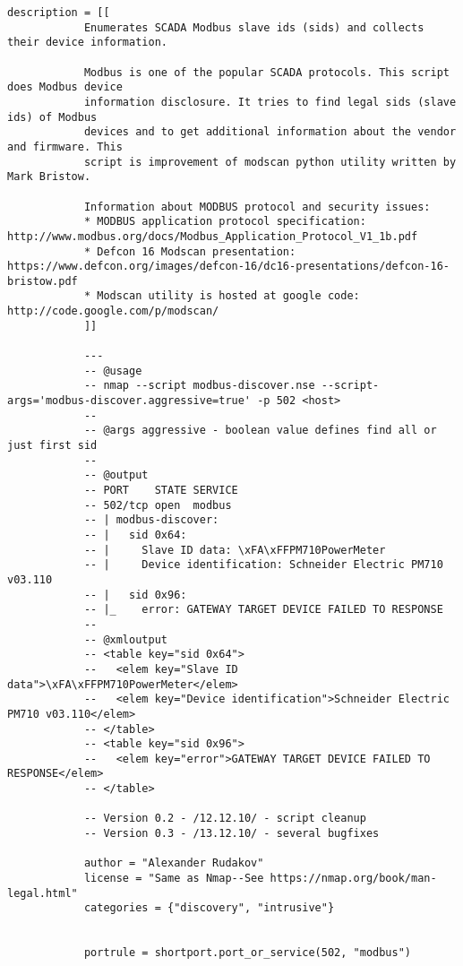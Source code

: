 \documentclass[article,msc=informatik,type=msc,colorback,accentcolor=tud9c]{tudthesis}
\begin{document}
\begin{appendix}
\begin{lstlisting}[caption= Nmap Modbus Discovery Script, label=lst:Nmap Modbus Discovery Script]
  	      	description = [[
  	      	Enumerates SCADA Modbus slave ids (sids) and collects their device information.
  	      	
  	      	Modbus is one of the popular SCADA protocols. This script does Modbus device
  	      	information disclosure. It tries to find legal sids (slave ids) of Modbus
  	      	devices and to get additional information about the vendor and firmware. This
  	      	script is improvement of modscan python utility written by Mark Bristow.
  	      	
  	      	Information about MODBUS protocol and security issues:
  	      	* MODBUS application protocol specification:  http://www.modbus.org/docs/Modbus_Application_Protocol_V1_1b.pdf
  	      	* Defcon 16 Modscan presentation: https://www.defcon.org/images/defcon-16/dc16-presentations/defcon-16-bristow.pdf
  	      	* Modscan utility is hosted at google code: http://code.google.com/p/modscan/
  	      	]]
  	      	
  	      	---
  	      	-- @usage
  	      	-- nmap --script modbus-discover.nse --script-args='modbus-discover.aggressive=true' -p 502 <host>
  	      	--
  	      	-- @args aggressive - boolean value defines find all or just first sid
  	      	--
  	      	-- @output
  	      	-- PORT    STATE SERVICE
  	      	-- 502/tcp open  modbus
  	      	-- | modbus-discover:
  	      	-- |   sid 0x64:
  	      	-- |     Slave ID data: \xFA\xFFPM710PowerMeter
  	      	-- |     Device identification: Schneider Electric PM710 v03.110
  	      	-- |   sid 0x96:
  	      	-- |_    error: GATEWAY TARGET DEVICE FAILED TO RESPONSE
  	      	--
  	      	-- @xmloutput
  	      	-- <table key="sid 0x64">
  	      	--   <elem key="Slave ID data">\xFA\xFFPM710PowerMeter</elem>
  	      	--   <elem key="Device identification">Schneider Electric PM710 v03.110</elem>
  	      	-- </table>
  	      	-- <table key="sid 0x96">
  	      	--   <elem key="error">GATEWAY TARGET DEVICE FAILED TO RESPONSE</elem>
  	      	-- </table>
  	      	
  	      	-- Version 0.2 - /12.12.10/ - script cleanup
  	      	-- Version 0.3 - /13.12.10/ - several bugfixes
  	      	
  	      	author = "Alexander Rudakov"
  	      	license = "Same as Nmap--See https://nmap.org/book/man-legal.html"
  	      	categories = {"discovery", "intrusive"}
  	      	
  	      	
  	      	portrule = shortport.port_or_service(502, "modbus")
  	      	

\end{lstlisting}
\end{appendix}
\end{document}
